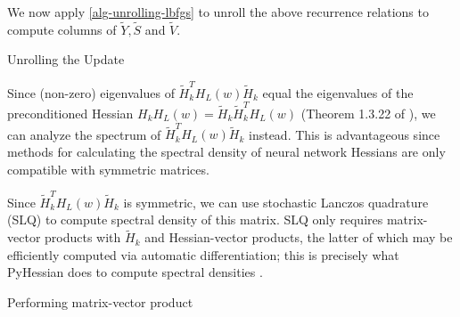 We now apply \cref{alg-unrolling-lbfgs} to unroll the above recurrence relations to compute columns of $\tilde Y, \tilde S$ and $\tilde V$. 

\begin{algorithm}[H]
  \centering
  \caption{Unrolling the \lbfgs{} Update}
  \label{alg-unrolling-lbfgs}
  \begin{algorithmic}
        \ENDFOR
    \ENDFOR
  \end{algorithmic}
\end{algorithm}

Since (non-zero) eigenvalues of $\tilde{H}_{k}^{T} H_L(w)\tilde{H}_{k}$ equal the eigenvalues of the preconditioned Hessian $H_{k} H_L(w) = \tilde{H}_k \tilde{H}_k^{T} H_L(w)$ (Theorem 1.3.22 of \citet{horn2012matrix}), we can analyze the spectrum of $\tilde{H}_{k}^{T}H_L(w)\tilde{H}_{k}$ instead.
This is advantageous since methods for calculating the spectral density of neural network Hessians are only compatible with symmetric matrices.

Since $\tilde{H}_{k}^{T} H_L(w)\tilde{H}_{k}$ is symmetric, we can use stochastic Lanczos quadrature (SLQ) \cite{golub2009matrices,lin2016approximating} to compute spectral density of this matrix.
SLQ only requires matrix-vector products with $\tilde H_k$ and Hessian-vector products, the latter of which may be efficiently computed via automatic differentiation; this is precisely what PyHessian does to compute spectral densities \cite{yao2020pyhessian}.

\begin{algorithm}[H]
  \centering
  \caption{Performing matrix-vector product}
  \label{alg-mvp}
  \begin{algorithmic}
  \end{algorithmic}
\end{algorithm}

